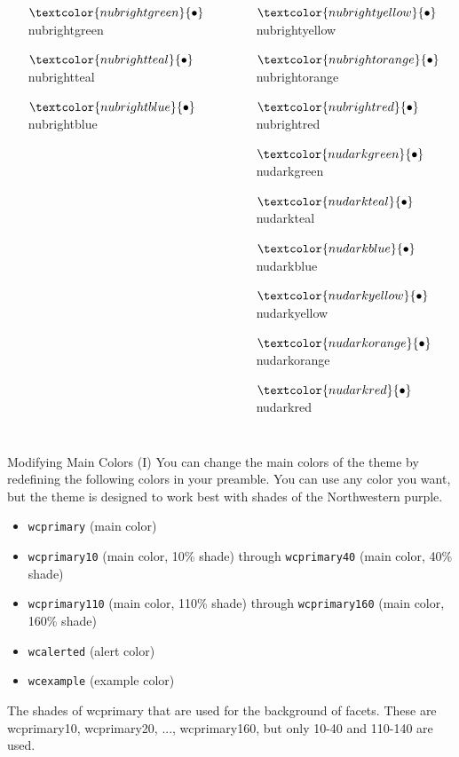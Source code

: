 \documentclass[aspectratio=1610]{beamer}
\begin{document}
\begin{frame}
\begin{columns}
\begin{itemize}
        \item[$\textcolor{nubrightgreen}{\bullet}$] \textcolor{nubrightgreen}{nubrightgreen}
        \item[$\textcolor{nubrightteal}{\bullet}$] \textcolor{nubrightteal}{nubrightteal}
        \item[$\textcolor{nubrightblue}{\bullet}$] \textcolor{nubrightblue}{nubrightblue}
    \end{itemize}
    \begin{itemize}
        \item[$\textcolor{nubrightyellow}{\bullet}$] \textcolor{nubrightyellow}{nubrightyellow}
        \item[$\textcolor{nubrightorange}{\bullet}$] \textcolor{nubrightorange}{nubrightorange}
        \item[$\textcolor{nubrightred}{\bullet}$] \textcolor{nubrightred}{nubrightred}
        \item[$\textcolor{nudarkgreen}{\bullet}$] \textcolor{nudarkgreen}{nudarkgreen}
        \item[$\textcolor{nudarkteal}{\bullet}$] \textcolor{nudarkteal}{nudarkteal}
        \item[$\textcolor{nudarkblue}{\bullet}$] \textcolor{nudarkblue}{nudarkblue}
        \item[$\textcolor{nudarkyellow}{\bullet}$] \textcolor{nudarkyellow}{nudarkyellow}
        \item[$\textcolor{nudarkorange}{\bullet}$] \textcolor{nudarkorange}{nudarkorange}
        \item[$\textcolor{nudarkred}{\bullet}$] \textcolor{nudarkred}{nudarkred}
    \end{itemize}
    \end{columns}
\end{frame}

\begin{frame}{Modifying Main Colors (I)}
    You can change the main colors of the theme by redefining the following colors in your preamble. You can use any color you want, but the theme is designed to work best with shades of the Northwestern purple.
    \begin{itemize}
        \item \texttt{wcprimary} (main color)
        \item \texttt{wcprimary10} (main color, 10\% shade) through \texttt{wcprimary40} (main color, 40\% shade)
        \item \texttt{wcprimary110} (main color, 110\% shade) through \texttt{wcprimary160} (main color, 160\% shade)
        \item \texttt{wcalerted} (alert color)
        \item \texttt{wcexample} (example color)
    \end{itemize}
   The shades of wcprimary that are used for the background of facets. These are wcprimary10, wcprimary20, ..., wcprimary160, but only 10-40 and 110-140 are used.
\end{frame}
\end{document}
